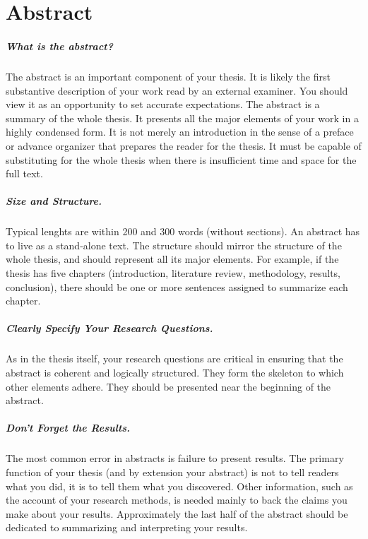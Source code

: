 \chapter*{Abstract}

\paragraph{What is the abstract?}

The abstract is an important component of your thesis. It is likely the first substantive description of your work read by an external examiner. You should view it as an opportunity to set accurate expectations.
The abstract is a summary of the whole thesis. It presents all the major elements of your work in a highly condensed form.
It is not merely an introduction in the sense of a preface or advance organizer that prepares the reader for the thesis. It must be capable of substituting for the whole thesis when there is insufficient time and space for the full text.

\paragraph{Size and Structure.}

Typical lenghts are within 200 and 300 words (without sections).
An abstract has to live as a stand-alone text.
The structure should mirror the structure of the whole thesis, and should represent all its major elements.
For example, if the thesis has five chapters (introduction, literature review, methodology, results, conclusion), there should be one or more sentences assigned to summarize each chapter.

\paragraph{Clearly Specify Your Research Questions.}

As in the thesis itself, your research questions are critical in ensuring that the abstract is coherent and logically structured. They form the skeleton to which other elements adhere.
They should be presented near the beginning of the abstract.

\paragraph{Don't Forget the Results.}

The most common error in abstracts is failure to present results.
The primary function of your thesis (and by extension your abstract) is not to tell readers what you did, it is to tell them what you discovered. Other information, such as the account of your research methods, is needed mainly to back the claims you make about your results.
Approximately the last half of the abstract should be dedicated to summarizing and interpreting your results.

\thispagestyle{empty}
\mbox{}
\newpage
